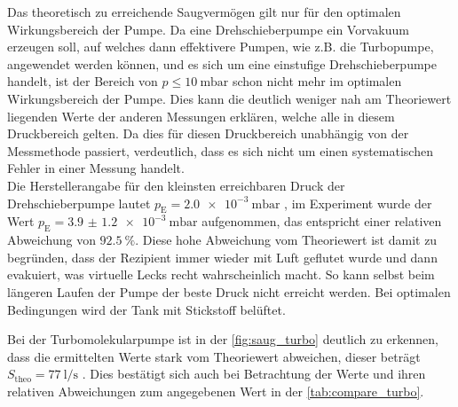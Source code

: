 \noindent Das theoretisch zu erreichende Saugvermögen gilt nur für den optimalen Wirkungsbereich der Pumpe. Da eine Drehschieberpumpe ein Vorvakuum erzeugen soll, auf welches dann effektivere Pumpen, 
wie z.B. die Turbopumpe, angewendet werden können, und es sich um eine einstufige Drehschieberpumpe handelt, ist der Bereich von $p \leq \SI{10}{\milli\bar}$ schon nicht mehr im optimalen 
Wirkungsbereich der Pumpe. Dies kann die deutlich weniger nah am Theoriewert liegenden Werte der anderen Messungen erklären, welche alle in diesem Druckbereich gelten. 
Da dies für diesen Druckbereich unabhängig von der Messmethode passiert, verdeutlich, dass es sich nicht um einen systematischen Fehler in einer Messung handelt. \\ 
Die Herstellerangabe für den kleinsten erreichbaren Druck der Drehschieberpumpe lautet $p_\text{E} = \SI{2.0e-3}{\milli\bar}$ \cite{anleitung}, im Experiment wurde der Wert 
$p_\text{E} = \SI{3.9(12)e-3}{\milli\bar}$ aufgenommen, das entspricht einer relativen Abweichung von $\SI{92.5}{\percent}$. Diese hohe Abweichung vom Theoriewert ist damit zu begründen, 
dass der Rezipient immer wieder mit Luft geflutet wurde und dann evakuiert, was virtuelle Lecks recht wahrscheinlich macht. So kann selbst beim längeren Laufen der Pumpe der beste Druck 
nicht erreicht werden. Bei optimalen Bedingungen wird der Tank mit Stickstoff belüftet. 

\noindent Bei der Turbomolekularpumpe ist in der \autoref{fig:saug_turbo} deutlich zu erkennen, dass die ermittelten Werte stark vom Theoriewert abweichen, dieser beträgt $S_\text{theo} =
\SI{77}{\litre\per\second}$ \cite{anleitung}. Dies bestätigt sich auch bei Betrachtung der Werte und ihren relativen Abweichungen zum angegebenen Wert in der \autoref{tab:compare_turbo}. 

